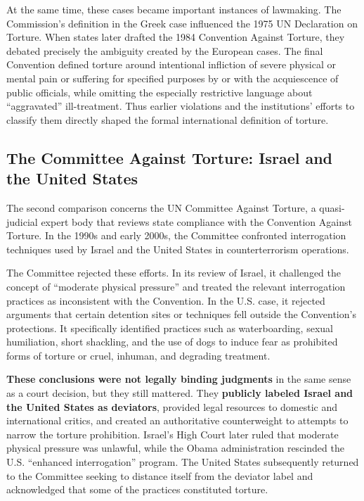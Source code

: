 At the same time, these cases became important instances of lawmaking. The Commission's definition in the Greek case influenced the 1975 UN Declaration on Torture. When states later drafted the 1984 Convention Against Torture, they debated precisely the ambiguity created by the European cases. The final Convention defined torture around intentional infliction of severe physical or mental pain or suffering for specified purposes by or with the acquiescence of public officials, while omitting the especially restrictive language about ``aggravated'' ill-treatment. Thus earlier violations and the institutions' efforts to classify them directly shaped the formal international definition of torture.

\subsection{The Committee Against Torture: Israel and the United States}

The second comparison concerns the UN Committee Against Torture, a quasi-judicial expert body that reviews state compliance with the Convention Against Torture. In the 1990s and early 2000s, the Committee confronted interrogation techniques used by Israel and the United States in counterterrorism operations.

The Committee rejected these efforts. In its review of Israel, it challenged the concept of ``moderate physical pressure'' and treated the relevant interrogation practices as inconsistent with the Convention. In the U.S. case, it rejected arguments that certain detention sites or techniques fell outside the Convention's protections. It specifically identified practices such as waterboarding, sexual humiliation, short shackling, and the use of dogs to induce fear as prohibited forms of torture or cruel, inhuman, and degrading treatment.

\textbf{These conclusions were not legally binding judgments} in the same sense as a court decision, but they still mattered. They \textbf{publicly labeled Israel and the United States as deviators}, provided legal resources to domestic and international critics, and created an authoritative counterweight to attempts to narrow the torture prohibition. Israel's High Court later ruled that moderate physical pressure was unlawful, while the Obama administration rescinded the U.S. ``enhanced interrogation'' program. The United States subsequently returned to the Committee seeking to distance itself from the deviator label and acknowledged that some of the practices constituted torture.

